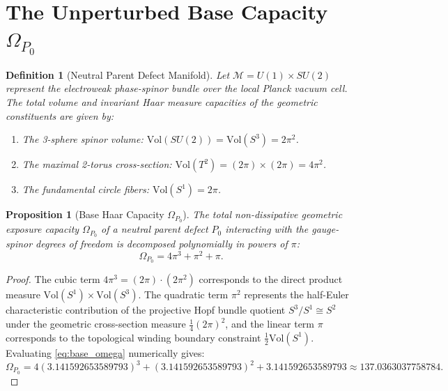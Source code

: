 \documentclass[11pt,a4paper]{article}
\newtheorem{proposition}[theorem]{Proposition}
\newtheorem{definition}[theorem]{Definition}
\begin{document}
\section{The Unperturbed Base Capacity \texorpdfstring{$\Omega_{P_0}$}{Omega P0}}\label{sec:base}

\begin{definition}[Neutral Parent Defect Manifold]
Let $\mathcal{M} = U(1) \times SU(2)$ represent the electroweak phase-spinor bundle over the local Planck vacuum cell. The total volume and invariant Haar measure capacities of the geometric constituents are given by:
\begin{enumerate}
    \item The 3-sphere spinor volume: $\text{Vol}(SU(2)) = \text{Vol}(S^3) = 2\pi^2$.
    \item The maximal 2-torus cross-section: $\text{Vol}(T^2) = (2\pi) \times (2\pi) = 4\pi^2$.
    \item The fundamental circle fibers: $\text{Vol}(S^1) = 2\pi$.
\end{enumerate}
\end{definition}

\begin{proposition}[Base Haar Capacity $\Omega_{P_0}$]
The total non-dissipative geometric exposure capacity $\Omega_{P_0}$ of a neutral parent defect $P_0$ interacting with the gauge-spinor degrees of freedom is decomposed polynomially in powers of $\pi$:
\begin{equation}
\Omega_{P_0} = 4\pi^3 + \pi^2 + \pi.
\label{eq:base_omega}
\end{equation}
\end{proposition}

\begin{proof}
The cubic term $4\pi^3 = (2\pi) \cdot (2\pi^2)$ corresponds to the direct product measure $\text{Vol}(S^1) \times \text{Vol}(S^3)$. The quadratic term $\pi^2$ represents the half-Euler characteristic contribution of the projective Hopf bundle quotient $S^3 / S^1 \cong S^2$ under the geometric cross-section measure $\frac{1}{4}(2\pi)^2$, and the linear term $\pi$ corresponds to the topological winding boundary constraint $\frac{1}{2}\text{Vol}(S^1)$. Evaluating \eqref{eq:base_omega} numerically gives:
\begin{equation}
\Omega_{P_0} = 4(3.141592653589793)^3 + (3.141592653589793)^2 + 3.141592653589793 \approx 137.0363037758784.
\end{equation}
\end{proof}
\end{document}
